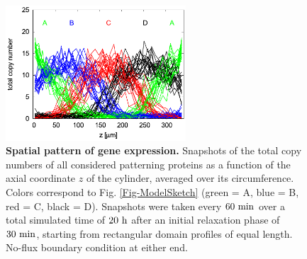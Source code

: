\documentclass[a4paper,10pt]{article}
\newcommand{\GA}{A\xspace}
\newcommand{\GB}{B\xspace}
\newcommand{\GC}{C\xspace}
\newcommand{\GD}{D\xspace}
\newcommand{\unit}[1]{{\rm #1}}
\begin{document}
\begin{figure}[ht!]
  \centering
  \includegraphics[width=0.6\textwidth]{Figures/FigureSystemDynamicsPinnedStable.pdf}
  \caption{\textbf{Spatial pattern of gene expression.}
      Snapshots of the total copy numbers of all considered patterning proteins
      as a function of the axial coordinate $z$ of the cylinder, averaged over its circumference.
      Colors correspond to Fig. \ref{Fig-ModelSketch} (green = \GA, blue = \GB, red = \GC, black = \GD).
      Snapshots were taken every $60~\unit{min}$ over a total simulated time of $20~\unit{h}$ after
      an initial relaxation phase of $30~\unit{min}$, starting from rectangular domain profiles
      of equal length. No-flux boundary condition at either end.
  \label{Fig-TypicalOutput}
  }
\end{figure} 
\end{document}
